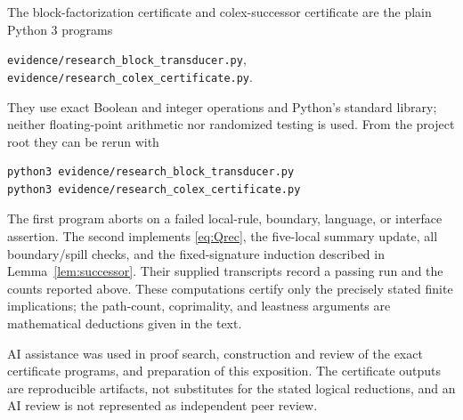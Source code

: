 \documentclass[11pt]{article}
\theoremstyle{remark}
\begin{document}
The block-factorization certificate and colex-successor certificate are the
plain Python 3 programs
\begin{center}
\texttt{evidence/research\_block\_transducer.py},\qquad
\texttt{evidence/research\_colex\_certificate.py}.
\end{center}
They use exact Boolean and integer operations and Python's standard library;
neither floating-point arithmetic nor randomized testing is used.  From the
project root they can be rerun with
\begin{verbatim}
python3 evidence/research_block_transducer.py
python3 evidence/research_colex_certificate.py
\end{verbatim}
The first program aborts on a failed local-rule, boundary, language, or
interface assertion.  The second implements \eqref{eq:Qrec}, the five-local
summary update, all boundary/spill checks, and the fixed-signature induction
described in Lemma~\ref{lem:successor}.  Their supplied transcripts record a
passing run and the counts reported above.  These computations certify only
the precisely stated finite implications; the path-count, coprimality, and
leastness arguments are mathematical deductions given in the text.

AI assistance was used in proof search, construction and review of the exact
certificate programs, and preparation of this exposition.  The certificate
outputs are reproducible artifacts, not substitutes for the stated logical
reductions, and an AI review is not represented as independent peer review.



\end{document}
